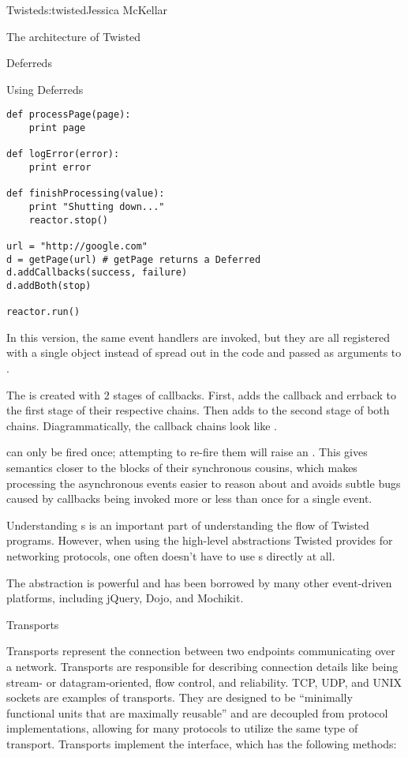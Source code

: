 \begin{aosachapter}{Twisted}{s:twisted}{Jessica McKellar}
\begin{aosasect1}{The architecture of Twisted}
\begin{aosasect2}{Deferreds}
\begin{aosasect3}{Using Deferreds}
\begin{verbatim}
def processPage(page):
    print page

def logError(error):
    print error

def finishProcessing(value):
    print "Shutting down..."
    reactor.stop()

url = "http://google.com"
d = getPage(url) # getPage returns a Deferred
d.addCallbacks(success, failure)
d.addBoth(stop)

reactor.run()
\end{verbatim}

In this version, the same event handlers are invoked, but they are all
registered with a single  object instead of spread out in
the code and passed as arguments to .

The  is created with 2 stages of callbacks. First,
 adds the  callback and
 errback to the first stage of their respective
chains. Then  adds  to the second
stage of both chains. Diagrammatically, the callback chains look like
.


 can only be fired once; attempting to re-fire them
will raise an . This gives 
semantics closer to the  blocks of their synchronous
cousins, which makes processing the asynchronous events easier to reason about
and avoids subtle bugs caused by callbacks being invoked more or less than once
for a single event.

Understanding s is an important part of understanding
the flow of Twisted programs. However, when using the high-level abstractions
Twisted provides for networking protocols, one often doesn't have to use
s directly at all.

The  abstraction is powerful and has been borrowed by
many other event-driven platforms, including jQuery, Dojo, and Mochikit.

\end{aosasect3}

\end{aosasect2}

\begin{aosasect2}{Transports}

Transports represent the connection between two endpoints communicating over
a network. Transports are responsible for describing connection details like
being stream- or datagram-oriented, flow control, and reliability. TCP, UDP, and
UNIX sockets are examples of transports. They are designed to be ``minimally
functional units that are maximally reusable'' and are decoupled from protocol
implementations, allowing for many protocols to utilize the same type of
transport. Transports implement the  interface, which has
the following methods:


\end{aosasect2}
\end{aosasect1}
\end{aosachapter}

